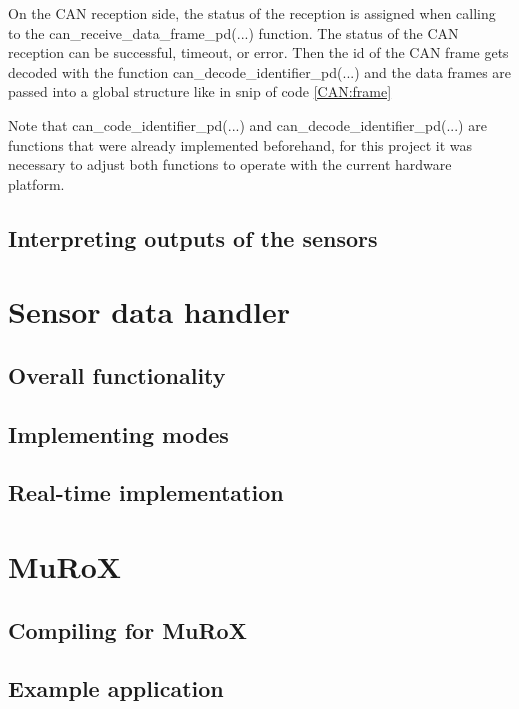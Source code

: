 \documentclass[12pt]{report}%
\begin{document}
On the CAN reception side, the status of the reception is assigned when calling to the can\_receive\_data\_frame\_pd(...) function. The status of the CAN reception can be successful, timeout, or error. Then the id of the CAN frame gets decoded with the function can\_decode\_identifier\_pd(...) and the data frames are passed into a global structure like in snip of code \ref{CAN:frame}

Note that can\_code\_identifier\_pd(...) and can\_decode\_identifier\_pd(...) are functions that were already implemented beforehand, for this project it was necessary to adjust both functions to operate with the current hardware platform.

\section{Interpreting outputs of the sensors}
\label{sec:sensorout}

\chapter{Sensor data handler}
\section{Overall functionality}

\section{Implementing modes}

\section{Real-time implementation}

\chapter{MuRoX}
\section{Compiling for MuRoX}

\section{Example application}
\label{sect:example}
\end{document}

